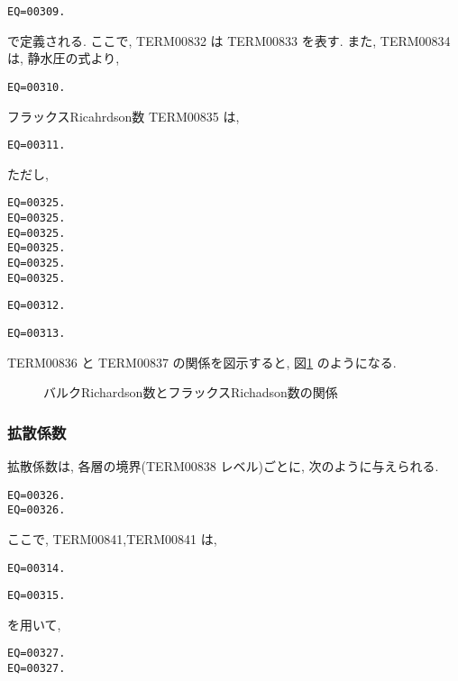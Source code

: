 \begin{verbatim}
EQ=00309.
\end{verbatim}
で定義される.
ここで, TERM00832 は TERM00833 を表す.
また, TERM00834 は, 静水圧の式より,
\begin{verbatim}
EQ=00310.
\end{verbatim}

フラックスRicahrdson数 TERM00835 は,

\begin{verbatim}
EQ=00311.
\end{verbatim}
ただし, 

\begin{verbatim}
EQ=00325.
EQ=00325.
EQ=00325.
EQ=00325.
EQ=00325.
EQ=00325.
\end{verbatim}
\begin{verbatim}
EQ=00312.
\end{verbatim}

\begin{verbatim}
EQ=00313.
\end{verbatim}

TERM00836 と TERM00837 の関係を図示すると,
図\ref{p-dif:rib-rif} のようになる.

\begin{figure}[htbp]
  \begin{center}
    \caption{バルクRichardson数とフラックスRichadson数の関係}
    \label{p-dif:rib-rif}
  \end{center}
\end{figure}

\subsubsection{拡散係数}

拡散係数は,
各層の境界(TERM00838 レベル)ごとに,
次のように与えられる.

\begin{verbatim}
EQ=00326.
EQ=00326.
\end{verbatim}

ここで, TERM00841,TERM00841 は,
\begin{verbatim}
EQ=00314.
\end{verbatim}
%
\begin{verbatim}
EQ=00315.
\end{verbatim}
を用いて,
\begin{verbatim}
EQ=00327.
EQ=00327.
\end{verbatim} 

